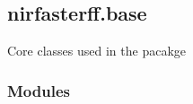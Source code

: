 \documentclass[letterpaper,10pt,english]{sphinxmanual}
\begin{document}
\sphinxstepscope


\subsection{nirfasterff.base}
\label{\detokenize{_autosummary/nirfasterff.base:module-nirfasterff.base}}\label{\detokenize{_autosummary/nirfasterff.base:nirfasterff-base}}\label{\detokenize{_autosummary/nirfasterff.base::doc}}
\sphinxAtStartPar
Core classes used in the pacakge
\subsubsection*{Modules}
\end{document}
